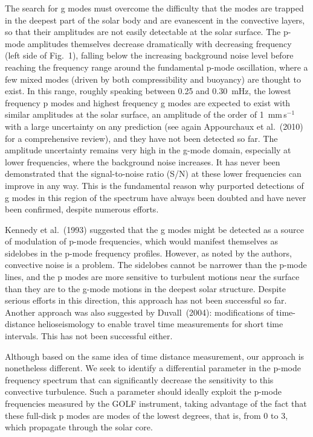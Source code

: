 \documentclass[bibyear]{aa}
\begin{document}
The  search for g modes must overcome the difficulty that the
modes are trapped in the deepest part of the solar body and are evanescent in the convective layers, so that their amplitudes are not easily detectable at the solar surface.  The p-mode amplitudes themselves decrease dramatically with decreasing frequency (left side of Fig.~1), falling below the increasing background noise level before reaching the frequency range around the fundamental  p-mode oscillation, where a few mixed modes (driven by both compressibility and buoyancy) are thought to exist. In this range, roughly speaking between 0.25 and 0.30~mHz, the lowest frequency p modes and highest frequency g modes are expected to exist with similar amplitudes at the solar surface, an amplitude of the order of 1~mm\,s$^{-1}$ with a large uncertainty on any prediction (see again Appourchaux et al.~(2010) for a comprehensive review), and they have not been detected so far. The amplitude uncertainty remains very high in the g-mode domain, especially at lower frequencies, where the background noise increases. It has never been demonstrated that the signal-to-noise ratio (S/N) at these lower frequencies can improve in any way. This is the fundamental reason why purported detections of g modes in this region of the spectrum have always been doubted and have never been confirmed, despite numerous efforts.

Kennedy et al.~(1993) suggested that the g modes might be detected as a source of modulation of p-mode frequencies, which would manifest themselves as sidelobes in the p-mode frequency profiles. However, as noted by the authors, convective noise is a problem. The sidelobes cannot be narrower than the p-mode lines, and  the p modes are more sensitive to turbulent motions near the surface than they are to the g-mode motions in the deepest solar structure. Despite serious efforts in this direction, this approach has not been successful so far.  Another approach was also suggested by Duvall~(2004): modifications of time-distance helioseismology to enable travel time measurements for short time intervals. This has not been successful either.

 Although based on the same idea of time distance measurement,  our approach is nonetheless different.  We seek to identify a differential parameter in the p-mode frequency spectrum that can significantly decrease the sensitivity to this convective turbulence. Such a parameter should ideally  exploit the p-mode frequencies measured by the GOLF instrument, taking advantage of the fact that these full-disk p modes are modes of the lowest degrees, that is, from 0 to 3, which propagate through the solar core.
\end{document}
